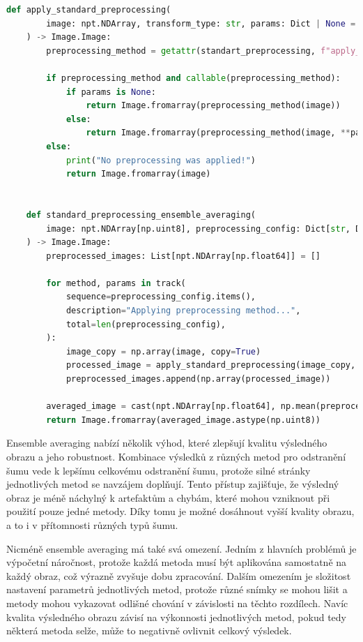 \documentclass[male,czech,api_ing]{thesis}
\begin{document}
\begin{lstlisting}[language=Python, caption={Implementace Ensemble Averaging metody}, label={lst:ensemble_averaging}]
    def apply_standard_preprocessing(
        image: npt.NDArray, transform_type: str, params: Dict | None = None
    ) -> Image.Image:
        preprocessing_method = getattr(standart_preprocessing, f"apply_{transform_type}")

        if preprocessing_method and callable(preprocessing_method):
            if params is None:
                return Image.fromarray(preprocessing_method(image))
            else:
                return Image.fromarray(preprocessing_method(image, **params))
        else:
            print("No preprocessing was applied!")
            return Image.fromarray(image)


    def standard_preprocessing_ensemble_averaging(
        image: npt.NDArray[np.uint8], preprocessing_config: Dict[str, Dict[str, Any]]
    ) -> Image.Image:
        preprocessed_images: List[npt.NDArray[np.float64]] = []

        for method, params in track(
            sequence=preprocessing_config.items(),
            description="Applying preprocessing method...",
            total=len(preprocessing_config),
        ):
            image_copy = np.array(image, copy=True)
            processed_image = apply_standard_preprocessing(image_copy, method, params)
            preprocessed_images.append(np.array(processed_image))

        averaged_image = cast(npt.NDArray[np.float64], np.mean(preprocessed_images, axis=0))
        return Image.fromarray(averaged_image.astype(np.uint8))
\end{lstlisting}

Ensemble averaging nabízí několik výhod, které zlepšují kvalitu výsledného obrazu a jeho robustnost. Kombinace výsledků z různých metod pro odstranění šumu vede k lepšímu celkovému odstranění šumu, protože silné stránky jednotlivých metod se navzájem doplňují. Tento přístup zajišťuje, že výsledný obraz je méně náchylný k artefaktům a chybám, které mohou vzniknout při použití pouze jedné metody. Díky tomu je možné dosáhnout vyšší kvality obrazu, a to i v přítomnosti různých typů šumu.

Nicméně ensemble averaging má také svá omezení. Jedním z hlavních problémů je výpočetní náročnost, protože každá metoda musí být aplikována samostatně na každý obraz, což výrazně zvyšuje dobu zpracování. Dalším omezením je složitost nastavení parametrů jednotlivých metod, protože různé snímky se mohou lišit a metody mohou vykazovat odlišné chování v závislosti na těchto rozdílech. Navíc kvalita výsledného obrazu závisí na výkonnosti jednotlivých metod, pokud tedy některá metoda selže, může to negativně ovlivnit celkový výsledek.
\end{document}
